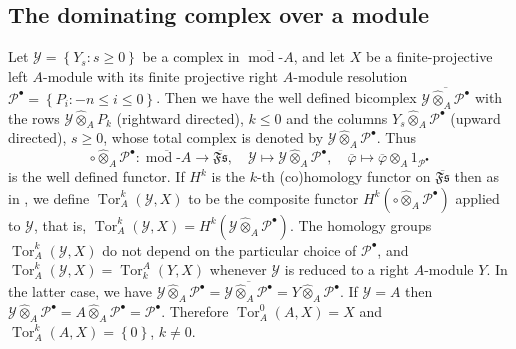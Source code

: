 \documentclass[12pt]{amsart}%
\theoremstyle{plain}
\numberwithin{equation}{section}
\numberwithin{equation}{section}
\numberwithin{theorem}{section}
\numberwithin{lemma}{section}
\numberwithin{remark}{section}
\numberwithin{example}{section}
\numberwithin{proposition}{section}
\numberwithin{definition}{section}
\numberwithin{corollary}{section}
\begin{document}
\subsection{The dominating complex over a module\label{subsecDomM}}

Let $\mathcal{Y}=\left\{  Y_{s}:s\geq0\right\}  $ be a complex in
$\overline{\operatorname*{mod}\text{-}A}$, and let $X$ be a finite-projective
left $A$-module with its finite projective right $A$-module resolution
$\mathcal{P}^{\bullet}=\left\{  P_{i}:-n\leq i\leq0\right\}  $. Then we have
the well defined bicomplex $\overline{\mathcal{Y}\widehat{\otimes}%
_{A}\mathcal{P}^{\bullet}}$ with the rows $\mathcal{Y}\widehat{\otimes}%
_{A}P_{k}$ (rightward directed), $k\leq0$ and the columns $Y_{s}%
\widehat{\otimes}_{A}\mathcal{P}^{\bullet}$ (upward directed), $s\geq0$, whose
total complex is denoted by $\mathcal{Y}\widehat{\otimes}_{A}\mathcal{P}%
^{\bullet}$. Thus
\[
\circ\widehat{\otimes}_{A}\mathcal{P}^{\bullet}:\overline{\operatorname*{mod}%
\text{-}A}\longrightarrow\overline{\mathfrak{Fs}},\quad\mathcal{Y\longmapsto
Y}\widehat{\otimes}_{A}\mathcal{P}^{\bullet},\quad\overline{\varphi}%
\mapsto\overline{\varphi}\otimes_{A}1_{\mathcal{P}^{\bullet}}%
\]
is the well defined functor. If $H^{k}$ is the $k$-th (co)homology functor on
$\overline{\mathfrak{Fs}}$ then as in \cite[6.2]{HelHom}, we define
$\operatorname{Tor}_{A}^{k}\left(  \mathcal{Y},X\right)  $ to be the composite
functor $H^{k}\left(  \circ\widehat{\otimes}_{A}\mathcal{P}^{\bullet}\right)
$ applied to $\mathcal{Y}$, that is, $\operatorname{Tor}_{A}^{k}\left(
\mathcal{Y},X\right)  =H^{k}\left(  \mathcal{Y}\widehat{\otimes}%
_{A}\mathcal{P}^{\bullet}\right)  $. The homology groups $\operatorname{Tor}%
_{A}^{k}\left(  \mathcal{Y},X\right)  $ do not depend on the particular choice
of $\mathcal{P}^{\bullet}$, and $\operatorname{Tor}_{A}^{k}\left(
\mathcal{Y},X\right)  =\operatorname{Tor}_{k}^{A}\left(  Y,X\right)  $
whenever $\mathcal{Y}$ is reduced to a right $A$-module $Y$. In the latter
case, we have $\mathcal{Y}\widehat{\otimes}_{A}\mathcal{P}^{\bullet}%
=\overline{\mathcal{Y}\widehat{\otimes}_{A}\mathcal{P}^{\bullet}%
}=Y\widehat{\otimes}_{A}\mathcal{P}^{\bullet}$. If $\mathcal{Y}=A$ then
$\mathcal{Y}\widehat{\otimes}_{A}\mathcal{P}^{\bullet}=A\widehat{\otimes}%
_{A}\mathcal{P}^{\bullet}=\mathcal{P}^{\bullet}$. Therefore
$\operatorname{Tor}_{A}^{0}\left(  A,X\right)  =X$ and $\operatorname{Tor}%
_{A}^{k}\left(  A,X\right)  =\left\{  0\right\}  $, $k\neq0$.
\end{document}
